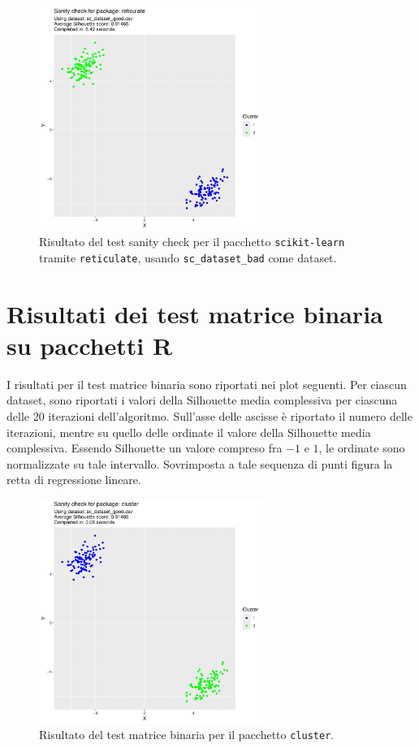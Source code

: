 \documentclass[a4paper, 12pt]{report}
\begin{document}
			\begin{figure}[H]
				\centering
				\includegraphics[width = 0.65\textwidth, page = 2]{results/results_RETICULATE.pdf}
				\caption{Risultato del test sanity check per il pacchetto \texttt{scikit-learn} tramite \texttt{reticulate}, usando \texttt{sc\_dataset\_bad} come dataset.}
				\label{fig:reticulatebad}
			\end{figure}

		\section{Risultati dei test matrice binaria su pacchetti R}

			I risultati per il test matrice binaria sono riportati nei plot
			seguenti. Per ciascun dataset, sono riportati i valori della
			Silhouette media complessiva per ciascuna delle 20 iterazioni
			dell'algoritmo. Sull'asse delle ascisse è riportato il numero
			delle iterazioni, mentre su quello delle ordinate il valore
			della Silhouette media complessiva. Essendo Silhouette un valore
			compreso fra $-1$ e $1$, le ordinate sono normalizzate su tale
			intervallo. Sovrimposta a tale sequenza di punti figura la retta
			di regressione lineare.

			\begin{figure}[H]
				\centering
				\includegraphics[width = 0.65\textwidth, page = 3]{results/results_CLUSTER.pdf}
				\caption{Risultato del test matrice binaria per il pacchetto \texttt{cluster}.}
				\label{fig:clusterbm}
			\end{figure}
\end{document}
